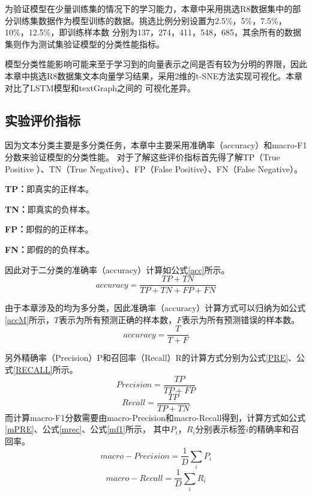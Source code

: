为验证模型在少量训练集的情况下的学习能力，本章中采用挑选R8数据集中的部分训练集数据作为模型训练的数据。挑选比例分别设置为2.5\%，5\%，7.5\%，10\%，12.5\%，即训练样本数
分别为137，274，411，548，685，其余所有的数据集则作为测试集验证模型的分类性能指标。

模型分类性能影响可能来至于学习到的向量表示之间是否有较为分明的界限，因此本章中挑选R8数据集文本向量学习结果，采用2维的t-SNE方法实现可视化。本章对比了LSTM模型和textGraph之间的
可视化差异。
\subsection{实验评价指标}
因为文本分类主要是多分类任务，本章中主要采用准确率（accuracy）和macro-F1分数来验证模型的分类性能。
对于了解这些评价指标首先得了解TP（True Positive ）、TN（True Negative）、FP（False Positive）、FN（False Negative）。

\textbf{TP：}即真实的正样本。

\textbf{TN：}即真实的负样本。

\textbf{FP：}即假的的正样本。

\textbf{FN：}即假的的负样本。

因此对于二分类的准确率（accuracy）计算如公式\ref{acc}所示。
\begin{equation}\label{acc}
    accuracy=\frac{TP+TN}{TP+TN+FP+FN}
\end{equation}

由于本章涉及的均为多分类，因此准确率（accuracy）计算方式可以归纳为如公式\ref{accM}所示，$T$表示为所有预测正确的样本数，$F$表示为所有预测错误的样本数。
\begin{equation}\label{accM}
    accuracy=\frac{T}{T+F}
\end{equation}

另外精确率（Precision）P和召回率（Recall）R的计算方式分别为公式\ref{PRE}、公式\ref{RECALL}所示。
\begin{equation}\label{PRE}
    Precision=\frac{TP}{TP+FP}
\end{equation}
\begin{equation}\label{RECALL}
    Recall=\frac{TP}{TP+TN}
\end{equation}
而计算macro-F1分数需要由macro-Precision和macro-Recall得到，计算方式如公式\ref{mPRE}、公式\ref{mrec}、公式\ref{mf1}所示，
其中$P_i$，$R_i$分别表示标签$i$的精确率和召回率。
\begin{equation}\label{mPRE}
    macro-Precision=\frac{1}{D}\sum_{i}{P_i}
\end{equation}
\begin{equation}\label{mrec}
    macro-Recall=\frac{1}{D}\sum_{i}{R_i}
\end{equation}


